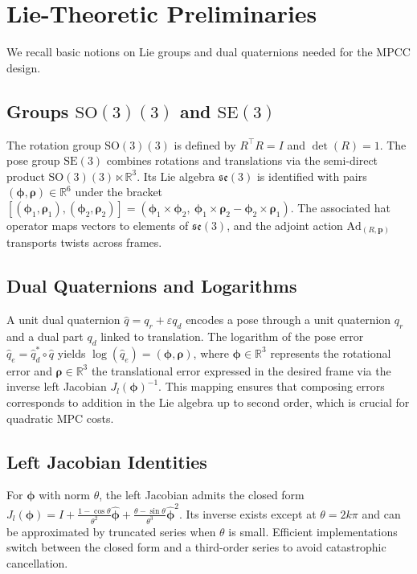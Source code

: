 \documentclass[letterpaper, 10pt, conference]{IEEEtran}
\newcommand{\SE}{\mathrm{SE}(3)}
\newcommand{\SO}{\mathrm{SO}(3)}
\newcommand{\RR}{\mathbb{R}}
\newcommand{\dq}{\hat{q}}
\newcommand{\dqE}{\dq_e}
\newcommand{\dqD}{\dq_d}
\begin{document}
\section{Lie-Theoretic Preliminaries}
\label{sec:preliminaries}
We recall basic notions on Lie groups and dual quaternions needed for the MPCC design.

\subsection{Groups $\SO(3)$ and $\SE$}
The rotation group $\SO(3)$ is defined by $R^\top R = I$ and $\det(R)=1$. The pose group $\SE$ combines rotations and translations via the semi-direct product $\SO(3) \ltimes \RR^3$. Its Lie algebra $\mathfrak{se}(3)$ is identified with pairs $(\bm{\phi}, \bm{\rho}) \in \RR^6$ under the bracket $[(\bm{\phi}_1,\bm{\rho}_1),(\bm{\phi}_2,\bm{\rho}_2)] = (\bm{\phi}_1 \times \bm{\phi}_2,\ \bm{\phi}_1 \times \bm{\rho}_2 - \bm{\phi}_2 \times \bm{\rho}_1)$. The associated hat operator maps vectors to elements of $\mathfrak{se}(3)$, and the adjoint action $\mathrm{Ad}_{(R,\mathbf{p})}$ transports twists across frames.

\subsection{Dual Quaternions and Logarithms}
A unit dual quaternion $\dq = q_r + \varepsilon q_d$ encodes a pose through a unit quaternion $q_r$ and a dual part $q_d$ linked to translation. The logarithm of the pose error $\dqE = \dqD^* \circ \dq$ yields $\log(\dqE) = (\bm{\phi}, \bm{\rho})$, where $\bm{\phi} \in \RR^3$ represents the rotational error and $\bm{\rho} \in \RR^3$ the translational error expressed in the desired frame via the inverse left Jacobian $J_l(\bm{\phi})^{-1}$. This mapping ensures that composing errors corresponds to addition in the Lie algebra up to second order, which is crucial for quadratic MPC costs.

\subsection{Left Jacobian Identities}
For $\bm{\phi}$ with norm $\theta$, the left Jacobian admits the closed form $J_l(\bm{\phi}) = I + \frac{1-\cos\theta}{\theta^2}\widehat{\bm{\phi}} + \frac{\theta-\sin\theta}{\theta^3}\widehat{\bm{\phi}}^2$. Its inverse exists except at $\theta = 2k\pi$ and can be approximated by truncated series when $\theta$ is small. Efficient implementations switch between the closed form and a third-order series to avoid catastrophic cancellation.
\end{document}

